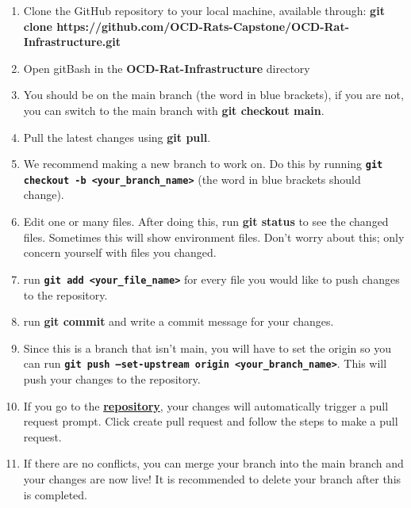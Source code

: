 \documentclass{article}
\begin{document}
\begin{enumerate}
  \item{Clone the GitHub repository to your local machine, available through: \textbf{git clone https://github.com/OCD-Rats-Capstone/OCD-Rat-Infrastructure.git}}
  \item{Open gitBash in the \textbf{OCD-Rat-Infrastructure} directory}
  \item{You should be on the main branch (the word in blue brackets), if you are not, you can switch to the main branch with \textbf{git checkout main}.}
  \item{Pull the latest changes using \textbf{git pull}.}
  \item{We recommend making a new branch to work on. Do this by running \textbf{\texttt{git checkout -b <your\_branch\_name>}} (the word in blue brackets should change).}
  \item{Edit one or many files. After doing this, run \textbf{git status} to see the changed files. Sometimes this will show environment files. Don't worry about this;
  only concern yourself with files you changed.}
  \item{run \textbf{\texttt{git add <your\_file\_name>}} for every file you would like to push changes to the repository.}
  \item{run \textbf{git commit} and write a commit message for your changes.}
  \item{Since this is a branch that isn't main, you will have to set the origin so you can run \textbf{\texttt{git push --set-upstream origin <your\_branch\_name>}}. 
  This will push your changes to the repository.}
  \item{If you go to the \href{https://github.com/OCD-Rats-Capstone/OCD-Rat-Infrastructure.git}{\textbf{repository}}, your changes will automatically trigger a pull request prompt.
  Click create pull request and follow the steps to make a pull request.}
  \item{If there are no conflicts, you can merge your branch into the main branch and your changes are now live! It is recommended to delete your branch after this is completed.}
\end{enumerate}
\end{document}

